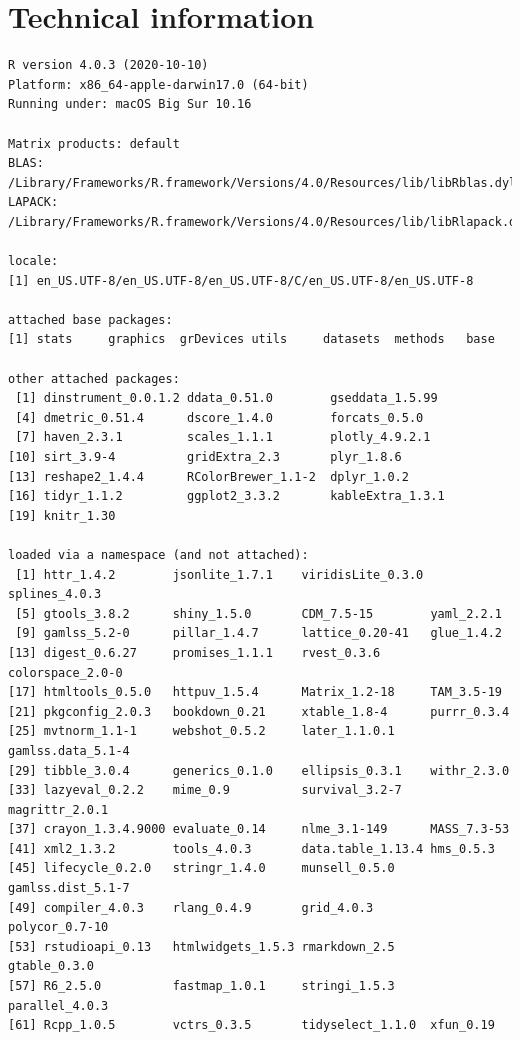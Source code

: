 \documentclass[
]{book}
\begin{document}
\hypertarget{ap:technical}{%
\chapter{Technical information}\label{ap:technical}}

\begin{verbatim}
R version 4.0.3 (2020-10-10)
Platform: x86_64-apple-darwin17.0 (64-bit)
Running under: macOS Big Sur 10.16

Matrix products: default
BLAS:   /Library/Frameworks/R.framework/Versions/4.0/Resources/lib/libRblas.dylib
LAPACK: /Library/Frameworks/R.framework/Versions/4.0/Resources/lib/libRlapack.dylib

locale:
[1] en_US.UTF-8/en_US.UTF-8/en_US.UTF-8/C/en_US.UTF-8/en_US.UTF-8

attached base packages:
[1] stats     graphics  grDevices utils     datasets  methods   base     

other attached packages:
 [1] dinstrument_0.0.1.2 ddata_0.51.0        gseddata_1.5.99    
 [4] dmetric_0.51.4      dscore_1.4.0        forcats_0.5.0      
 [7] haven_2.3.1         scales_1.1.1        plotly_4.9.2.1     
[10] sirt_3.9-4          gridExtra_2.3       plyr_1.8.6         
[13] reshape2_1.4.4      RColorBrewer_1.1-2  dplyr_1.0.2        
[16] tidyr_1.1.2         ggplot2_3.3.2       kableExtra_1.3.1   
[19] knitr_1.30         

loaded via a namespace (and not attached):
 [1] httr_1.4.2        jsonlite_1.7.1    viridisLite_0.3.0 splines_4.0.3    
 [5] gtools_3.8.2      shiny_1.5.0       CDM_7.5-15        yaml_2.2.1       
 [9] gamlss_5.2-0      pillar_1.4.7      lattice_0.20-41   glue_1.4.2       
[13] digest_0.6.27     promises_1.1.1    rvest_0.3.6       colorspace_2.0-0 
[17] htmltools_0.5.0   httpuv_1.5.4      Matrix_1.2-18     TAM_3.5-19       
[21] pkgconfig_2.0.3   bookdown_0.21     xtable_1.8-4      purrr_0.3.4      
[25] mvtnorm_1.1-1     webshot_0.5.2     later_1.1.0.1     gamlss.data_5.1-4
[29] tibble_3.0.4      generics_0.1.0    ellipsis_0.3.1    withr_2.3.0      
[33] lazyeval_0.2.2    mime_0.9          survival_3.2-7    magrittr_2.0.1   
[37] crayon_1.3.4.9000 evaluate_0.14     nlme_3.1-149      MASS_7.3-53      
[41] xml2_1.3.2        tools_4.0.3       data.table_1.13.4 hms_0.5.3        
[45] lifecycle_0.2.0   stringr_1.4.0     munsell_0.5.0     gamlss.dist_5.1-7
[49] compiler_4.0.3    rlang_0.4.9       grid_4.0.3        polycor_0.7-10   
[53] rstudioapi_0.13   htmlwidgets_1.5.3 rmarkdown_2.5     gtable_0.3.0     
[57] R6_2.5.0          fastmap_1.0.1     stringi_1.5.3     parallel_4.0.3   
[61] Rcpp_1.0.5        vctrs_0.3.5       tidyselect_1.1.0  xfun_0.19        
\end{verbatim}
\end{document}

